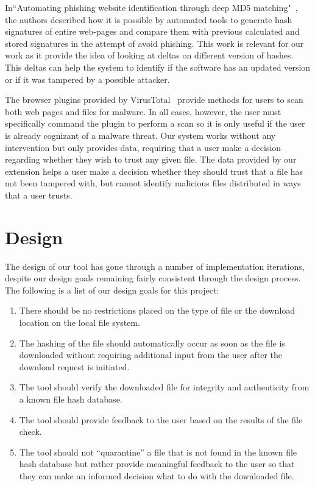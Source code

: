 \documentclass[letterpaper,twocolumn,10pt]{article}
\begin{document}
In``Automating phishing website identification through deep MD5 matching"~\cite{Wardman}, the authors described how it is possible by automated tools to generate hash signatures of entire web-pages and compare them with previous calculated and stored signatures in the attempt of avoid phishing. This work is relevant for our work as it provide the idea of looking at deltas on different version of hashes. This deltas can help the system to identify if the software has an updated version or if it was tampered by a possible attacker.

The browser plugins provided by VirusTotal~\cite{vtzilla,vtchromizer,vtexplorer} provide
methods for users to scan both web pages and files for malware. In all cases, however, the
user must specifically command the plugin to perform a scan so it is only useful if the user
is already cognizant of a malware threat. Our system works without any intervention
but only provides data, requiring that a user make a decision regarding whether they wish
to trust any given file. The data provided by our extension helps a user make a decision
whether they should trust that a file has not been tampered with, but cannot identify
malicious files distributed in ways that a user trusts.

\section{Design}

The design of our tool has gone through a number of implementation iterations, despite our design goals remaining fairly consistent through the design process. The following is a list of our design goals for this project:

\begin{enumerate}
\item There should be no restrictions placed on the type of file or the download location on the local file system.
\item The hashing of the file should automatically occur as soon as the file is downloaded without requiring additional input from the user after the download request is initiated.
\item The tool should verify the downloaded file for integrity and authenticity from a known file hash database.
\item The tool should provide feedback to the user based on the results of the file check.
\item The tool should not “quarantine” a file that is not found in the known file hash database but rather provide meaningful feedback to the user so that they can make an informed decision what to do with the downloaded file.
\end{enumerate}
\end{document}
